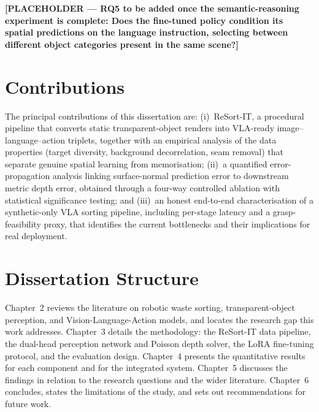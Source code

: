 \textbf{[PLACEHOLDER --- RQ5 to be added once the semantic-reasoning experiment is complete: Does the fine-tuned policy condition its spatial predictions on the language instruction, selecting between different object categories present in the same scene?]}

\section{Contributions}
\label{sec:contributions}

The principal contributions of this dissertation are: (i)~ReSort-IT, a procedural pipeline that converts static transparent-object renders into VLA-ready image--language--action triplets, together with an empirical analysis of the data properties (target diversity, background decorrelation, seam removal) that separate genuine spatial learning from memorisation; (ii)~a quantified error-propagation analysis linking surface-normal prediction error to downstream metric depth error, obtained through a four-way controlled ablation with statistical significance testing; and (iii)~an honest end-to-end characterisation of a synthetic-only VLA sorting pipeline, including per-stage latency and a grasp-feasibility proxy, that identifies the current bottlenecks and their implications for real deployment.

\section{Dissertation Structure}
\label{sec:structure}

Chapter~2 reviews the literature on robotic waste sorting, transparent-object perception, and Vision-Language-Action models, and locates the research gap this work addresses. Chapter~3 details the methodology: the ReSort-IT data pipeline, the dual-head perception network and Poisson depth solver, the LoRA fine-tuning protocol, and the evaluation design. Chapter~4 presents the quantitative results for each component and for the integrated system. Chapter~5 discusses the findings in relation to the research questions and the wider literature. Chapter~6 concludes, states the limitations of the study, and sets out recommendations for future work.